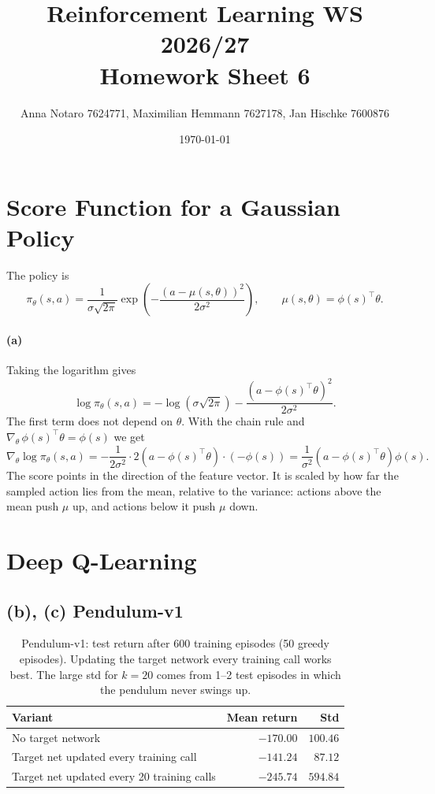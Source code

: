 \documentclass[11pt,a4paper]{article}
\title{Reinforcement Learning WS 2026/27\\Homework Sheet 6}
\author{Anna Notaro 7624771, Maximilian Hemmann 7627178, Jan Hischke 7600876}
\date{\today}
\begin{document}
\maketitle

\section{Score Function for a Gaussian Policy}

The policy is
\[
  \pi_\theta(s,a) = \frac{1}{\sigma\sqrt{2\pi}}
  \exp\!\left(-\frac{(a-\mu(s,\theta))^2}{2\sigma^2}\right),
  \qquad \mu(s,\theta) = \phi(s)^\top\theta .
\]

\paragraph{(a)} Taking the logarithm gives
\[
  \log \pi_\theta(s,a) = -\log\!\left(\sigma\sqrt{2\pi}\right)
  - \frac{\left(a-\phi(s)^\top\theta\right)^2}{2\sigma^2}.
\]
The first term does not depend on $\theta$. With the chain rule and
$\nabla_\theta\, \phi(s)^\top\theta = \phi(s)$ we get
\[
  \nabla_\theta \log \pi_\theta(s,a)
  = -\frac{1}{2\sigma^2}\cdot 2\left(a-\phi(s)^\top\theta\right)\cdot\left(-\phi(s)\right)
  = \boxed{\frac{1}{\sigma^2}\left(a-\phi(s)^\top\theta\right)\phi(s)} .
\]
The score points in the direction of the feature vector. It is scaled by how
far the sampled action lies from the mean, relative to the variance: actions
above the mean push $\mu$ up, and actions below it push $\mu$ down.

\section{Deep Q-Learning}

\subsection*{(b), (c) Pendulum-v1}

\begin{table}[H]
  \centering
  \begin{tabular}{lrr}
    \toprule
    Variant & Mean return & Std \\
    \midrule
    No target network                         & $-170.00$ & $100.46$ \\
    Target net updated every training call    & $-141.24$ & $87.12$  \\
    Target net updated every 20 training calls& $-245.74$ & $594.84$ \\
    \bottomrule
  \end{tabular}
  \caption{Pendulum-v1: test return after 600 training episodes (50 greedy
  episodes). Updating the target network every training call works best. The
  large std for $k=20$ comes from 1--2 test episodes in which the pendulum never
  swings up.}
  \label{tab:pendulum}
\end{table}
\end{document}
